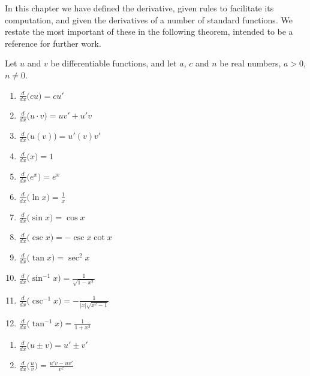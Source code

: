 
In this chapter we have defined the derivative, given rules to facilitate its computation, and given the derivatives of a number of standard functions. We restate the most important of these in the following theorem, intended to be a reference for further work.

{Let $u$ and $v$ be differentiable functions, and let $a$, $c$ and $n$ be real numbers, $a>0$, $n\neq 0$. \\

\noindent%
	\begin{minipage}{.5\specialboxlength}
	\begin{enumerate}
	\item		$\frac{d}{dx}\big(cu\big) = cu'$\addtocounter{enumi}{1}
	\item		$\frac{d}{dx}\big(u\cdot v\big) = uv'+u'v$\addtocounter{enumi}{1}
	\item		$\frac{d}{dx}\big(u(v)\big) = u'(v)v'$\addtocounter{enumi}{1}
	\item		$\frac{d}{dx}\big(x\big) = 1$\addtocounter{enumi}{1}
	\item		$\frac{d}{dx}\big(e^x\big) = e^x$\addtocounter{enumi}{1}
	\item		$\frac{d}{dx}\big(\ln x\big) = \frac{1}{x}$\addtocounter{enumi}{1}
	\item		$\frac{d}{dx}\big(\sin x\big) = \cos x$\addtocounter{enumi}{1}
	\item		$\frac{d}{dx}\big(\csc x\big) = -\csc x\cot x$\addtocounter{enumi}{1}
	\item		$\frac{d}{dx}\big(\tan x\big) = \sec^2x$\addtocounter{enumi}{1}
	\item		$\frac{d}{dx}\big(\sin^{-1}x\big) = \frac{1}{\sqrt{1-x^2}}$\addtocounter{enumi}{1}
	\item		$\frac{d}{dx}\big(\csc^{-1}x\big) = -\frac{1}{|x|\sqrt{x^2-1}}$\addtocounter{enumi}{1}
	\item		$\frac{d}{dx}\big(\tan^{-1}x\big) = \frac{1}{1+x^2}$\addtocounter{enumi}{1}
	\end{enumerate}
\normalsize
\end{minipage}
\begin{minipage}{.5\specialboxlength}
	\begin{enumerate}\addtocounter{enumi}{1}
	\item		$\frac{d}{dx}\big(u\pm v\big) = u'\pm v'$\addtocounter{enumi}{1}
	\item		$\frac{d}{dx}\big(\frac uv\big) = \frac{u'v-uv'}{v^2}$\addtocounter{enumi}{1}

\end{enumerate}
\end{minipage}}
